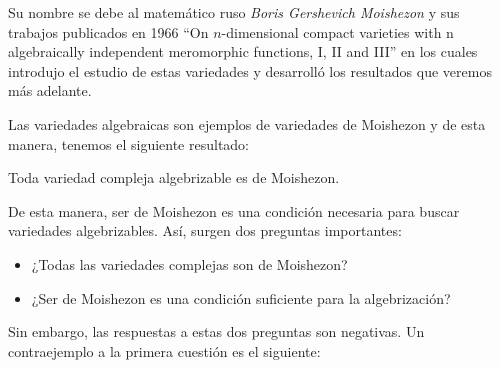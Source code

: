 Su nombre se debe al matemático ruso \textit{Boris Gershevich Moishezon} y sus trabajos publicados en 1966 \enquote{On $n$-dimensional compact varieties with n algebraically independent meromorphic functions, I, II and III} en los cuales introdujo el estudio de estas variedades y desarrolló los resultados que veremos más adelante.

Las variedades algebraicas son ejemplos de variedades de Moishezon y de esta manera, tenemos el siguiente resultado:

\begin{corollary}
	Toda variedad compleja algebrizable es de Moishezon.
\end{corollary}

De esta manera, ser de Moishezon es una condición necesaria para buscar variedades algebrizables. Así, surgen dos preguntas importantes:

\begin{itemize}
	\item ¿Todas las variedades complejas son de Moishezon?
	\item ¿Ser de Moishezon es una condición suficiente para la algebrización?
\end{itemize}
Sin embargo, las respuestas a estas dos preguntas son negativas. Un contraejemplo a la primera cuestión es el siguiente:

